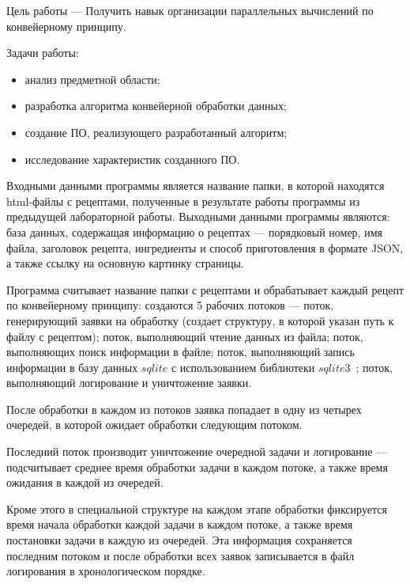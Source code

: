 

Цель работы --- Получить навык организации параллельных вычислений по конвейерному принципу. 

Задачи работы: 
\begin{itemize}
    \item анализ предметной области;
    \item разработка алгоритма конвейерной обработки данных;
    \item создание ПО, реализующего разработанный алгоритм;
    \item исследование характеристик созданного ПО.
\end{itemize}


Входными данными программы является название папки, в которой находятся html-файлы с рецептами, полученные в результате работы программы из предыдущей лабораторной работы. Выходными данными программы являются: база данных, содержащая информацию о рецептах --- порядковый номер, имя файла, заголовок рецепта, ингредиенты и способ приготовления в формате JSON, а также ссылку на основную картинку страницы.

 
Программа считывает название папки с рецептами и обрабатывает каждый рецепт по конвейерному принципу: создаются 5 рабочих потоков --- поток, генерирующий заявки на обработку (создает структуру, в которой указан путь к файлу с рецептом); поток, выполняющий чтение данных из файла; поток, выполняющих поиск информации в файле; поток, выполняющий запись информации в базу данных $sqlite$ с использованием библиотеки $sqlite3$~\cite{sqlite_lib}; поток, выполняющий логирование и уничтожение заявки.
\par После обработки в каждом из потоков заявка попадает в одну из четырех очередей, в которой ожидает обработки следующим потоком.
\par Последний поток производит уничтожение очередной задачи и логирование --- подсчитывает среднее время обработки задачи в каждом потоке, а также время ожидания в каждой из очередей.
\par Кроме этого в специальной структуре на каждом этапе обработки фиксируется время начала обработки каждой задачи в каждом потоке, а также время постановки задачи в каждую из очередей. Эта информация сохраняется последним потоком и после обработки всех заявок записывается в файл логирования в хронологическом порядке.

